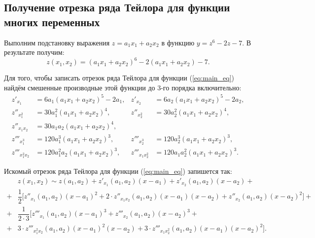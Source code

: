 \newpage


\subsection{Получение отрезка ряда Тейлора для функции многих переменных}

Выполним подстановку выражения $z = a_1x_1 + a_2x_2$ в функцию $y = z^6 - 2z - 7$.
В результате получим:
\begin{equation}
  \label{eq:main_eq}
  z (x_1, x_2) = (a_1 x_1 + a_2 x_2)^6 - 2(a_1 x_1 + a_2 x_2) - 7.
\end{equation}

\vspace{9mm}

Для того, чтобы записать отрезок ряда Тейлора для функции (\ref{eq:main_eq}) найдём
смешенные производные этой функции до 3-го порядка включительно:
\begin{align*}
  z'_{x_1} &= 6a_1(a_1 x_1 + a_2 x_2)^5 - 2a_1,     &z'_{x_2}& = 6a_2(a_1 x_1 + a_2 x_2)^5 - 2a_2, \\
  z''_{x_1^2} &= 30a_1^2(a_1 x_1 + a_2 x_2)^4,      &z''_{x_2^2}& = 30a_2^2(a_1 x_1 + a_2 x_2)^4, \\
  z''_{x_1 x_2} &= 30 a_1 a_2 (a_1 x_1 + a_2 x_2)^4, \\
  z'''_{x_1^3} &= 120 a_1^3 (a_1 x_1 + a_2 x_2)^3,  &z'''_{x_2^3}& = 120 a_2^3 (a_1 x_1 + a_2 x_2)^3, \\
  z'''_{x_1^2 x_2} &= 120 a_1^2 a_2 (a_1 x_1 + a_2 x_2)^3,  &z'''_{x_1 x_2^2}& = 120 a_1 a_2^2 (a_1 x_1 + a_2 x_2)^3.
\end{align*}

\vspace{9mm}

Искомый отрезок ряда Тейлора для функции (\ref{eq:main_eq}) запишется так:
\begin{align*}
  &z(x_1, x_2) \sim z(a_1, a_2) + z'_{x_1}(a_1, a_2)(x-a_1) + z'_{x_2}(a_1, a_2)(x-a_2) + \\
  +& \dfrac{1}{2} \Big[ z''_{x_1}(a_1, a_2) (x-a_1)^2 + 2 \cdot z''_{x_1 x_2}(a_1, a_2) (x-a_1)(x-a_2) + z''_{x_2}(a_1, a_2) (x-a_2)^2 \Big] + \\
  +& \dfrac{1}{2 \cdot 3} \Big[  z'''_{x_1}(a_1, a_2)(x-a_1)^3 + z'''_{x_2}(a_1, a_2)(x-a_2)^3 + \\
  +& 3 \cdot z'''_{x_1^2 x_2}(a_1, a_2) (x-a_1)^2(x-a_2) + 3 \cdot z'''_{x_1 x_2^2}(a_1, a_2) (x-a_1)(x-a_2)^2 \Big]. \\ 
\end{align*}

